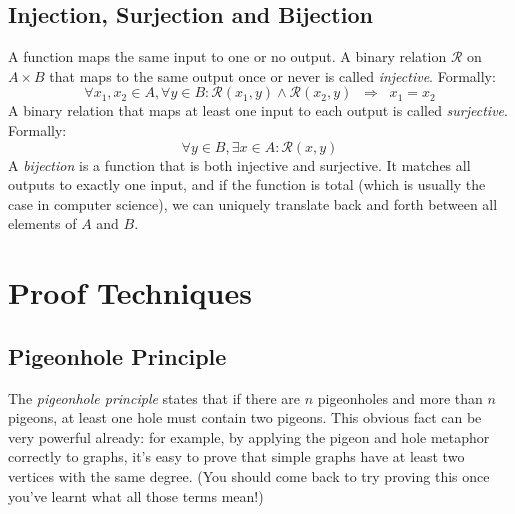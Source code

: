 \subsection*{Injection, Surjection and Bijection}
A function maps the same input to one or no output. A binary relation $\mathcal{R}$ on $A\times B$ that maps to the same output once or never is called \emph{injective}. Formally:
\begin{equation*}
	\forall x_1,x_2\in A, \forall y\in B : \mathcal{R}(x_1,y)  \wedge \mathcal{R}(x_2,y) \;\;\Rightarrow\;\; x_1 = x_2
\end{equation*}
A binary relation that maps at least one input to each output is called \emph{surjective}. Formally:
\begin{equation*}
	\forall y \in B, \exists x\in A : \mathcal{R}(x,y)
\end{equation*}
A \emph{bijection} is a function that is both injective and surjective. It matches all outputs to exactly one input, and if the function is total (which is usually the case in computer science), we can uniquely translate back and forth between all elements of $A$ and $B$.

\section*{Proof Techniques}

\subsection*{Pigeonhole Principle}
The \emph{pigeonhole principle} states that if there are $n$ pigeonholes and more than $n$ pigeons, at least one hole must contain two pigeons. This obvious fact can be very powerful already: for example, by applying the pigeon and hole metaphor correctly to graphs, it's easy to prove that simple graphs have at least two vertices with the same degree. (You should come back to try proving this once you've learnt what all those terms mean!)

